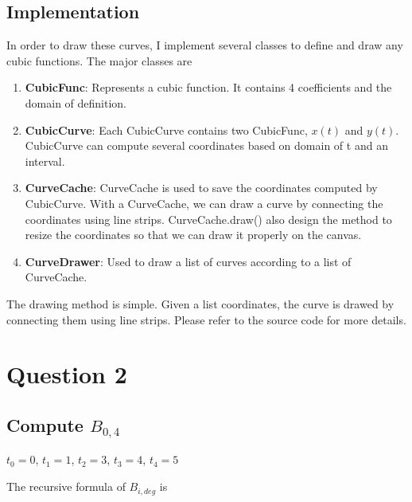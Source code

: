 \documentclass[12pt,a4paper]{article}
\theoremstyle{definition}
\numberwithin{equation}{section}
\numberwithin{figure}{section}
\begin{document}
\subsection{Implementation}
In order to draw these curves, I implement several classes to define and draw any cubic functions. The major classes are
\begin{enumerate}
	\item \textbf{CubicFunc}: Represents a cubic function. It contains 4 coefficients and the domain of definition.
	\item \textbf{CubicCurve}: Each CubicCurve contains two CubicFunc, $x(t)$ and $y(t)$. CubicCurve can compute several coordinates based on domain of t and an interval.
	\item \textbf{CurveCache}: CurveCache is used to save the coordinates computed by CubicCurve. With a CurveCache, we can draw a curve by connecting the coordinates using line strips. CurveCache.draw() also design the method to resize the coordinates so that we can draw it properly on the canvas.
	\item \textbf{CurveDrawer}: Used to draw a list of curves according to a list of CurveCache.
\end{enumerate}

The drawing method is simple. Given a list coordinates, the curve is drawed by connecting them using line strips. Please refer to the source code for more details.
\section{Question 2}
\subsection{Compute $B_{0,4}$}
$t_0=0$, $t_1=1$, $t_2=3$, $t_3=4$, $t_4=5$

The recursive formula of $B_{i,deg}$ is
\end{document}
